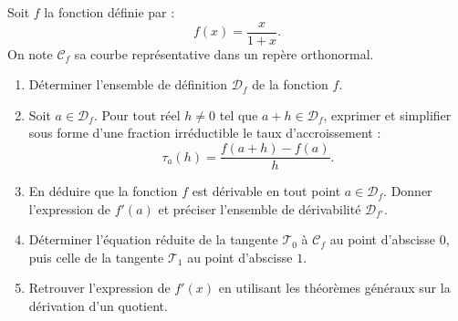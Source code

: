 \documentclass[11pt,a4paper]{article}
\begin{document}
Soit $f$ la fonction définie par :
\[
f(x) = \frac{x}{1+x}.
\]
On note $\mathcal{C}_f$ sa courbe représentative dans un repère orthonormal.
\begin{enumerate}[label=\textbf{\arabic*.}]
    \item Déterminer l'ensemble de définition $\mathcal{D}_f$ de la fonction $f$.
    \item Soit $a \in \mathcal{D}_f$. Pour tout réel $h \neq 0$ tel que $a+h \in \mathcal{D}_f$, exprimer et simplifier sous forme d'une fraction irréductible le taux d'accroissement :
    \[
    \tau_a(h) = \frac{f(a+h) - f(a)}{h}.
    \]
    \item En déduire que la fonction $f$ est dérivable en tout point $a \in \mathcal{D}_f$. Donner l'expression de $f'(a)$ et préciser l'ensemble de dérivabilité $\mathcal{D}_{f'}$.
    \item Déterminer l'équation réduite de la tangente $\mathcal{T}_0$ à $\mathcal{C}_f$ au point d'abscisse $0$, puis celle de la tangente $\mathcal{T}_1$ au point d'abscisse $1$.
    \item Retrouver l'expression de $f'(x)$ en utilisant les théorèmes généraux sur la dérivation d'un quotient.
\end{enumerate}
\end{document}

